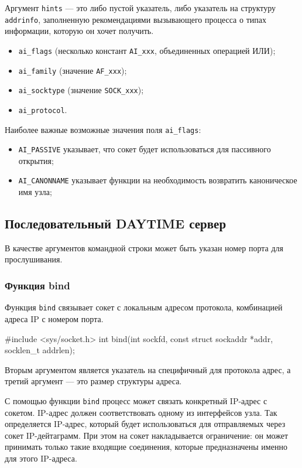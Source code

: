 Аргумент \lstinline{hints} --- это либо пустой указатель, либо указатель на структуру \lstinline{addrinfo}, заполненную рекомендациями вызывающего процесса о типах информации, которую он хочет получить.
\begin{itemize}
  \item \lstinline{ai_flags} (несколько констант \lstinline{AI_xxx}, объединенных операцией ИЛИ);
  \item \lstinline{ai_family} (значение \lstinline{AF_xxx});
  \item \lstinline{ai_socktype} (значение \lstinline{SOCK_xxx});
  \item \lstinline{ai_protocol}.
\end{itemize}

Наиболее важные возможные значения поля \lstinline{ai_flags}:
\begin{itemize}
  \item \lstinline{AI_PASSIVE} указывает, что сокет будет использоваться для пассивного открытия;
  \item \lstinline{AI_CANONNAME} указывает функции на необходимость возвратить каноническое имя узла;
\end{itemize}

\subsection{Последовательный DAYTIME сервер}
В качестве аргументов командной строки может быть указан номер порта для прослушивания.



\subsubsection{Функция bind}
Функция \lstinline{bind} связывает сокет с локальным адресом протокола, комбинацией адреса IP с номером порта.
\begin{clst}{}{}
#include <sys/socket.h>
int bind(int sockfd, const struct sockaddr *addr, socklen_t addrlen);
\end{clst}

Вторым аргументом является указатель на специфичный для протокола адрес, а третий аргумент --- это размер структуры адреса.

С помощью функции \lstinline{bind} процесс может связать конкретный IP-адрес с сокетом. IP-адрес должен соответствовать одному из интерфейсов узла. Так определяется IP-адрес, который будет использоваться для отправляемых через сокет IP-дейтаграмм. При этом на сокет накладывается ограничение: он может принимать только такие входящие соединения, которые предназначены именно для этого IP-адреса.

